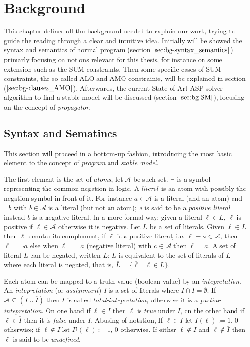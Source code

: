 \chapter{Background}

This chapter defines all the background needed to explain our work,
trying to guide the reading through a clear and intuitive idea.
Initially will be showed the syntax and semantics of normal
program (section $\ref{sec:bg-syntax_semantics}$),
primarly focusing on notions relevant for this thesis, for instance on some
extension such as the SUM constraints.
Then some specific cases of SUM constraints, the so-called ALO and AMO constraints, 
will be explained in section ($\ref{sec:bg-clauses_AMO}$).
Afterwards, the current State-of-Art ASP solver algorithm to find a stable model 
will be discussed (section $\ref{sec:bg-SM}$), focusing on the concept of \textit{propagator}.

\section{Syntax and Sematincs}
\label{sec:bg-syntax_semantics}

This section will proceed in a bottom-up fashion, introducing the 
most basic element to the concept of \textit{program}
and \textit{stable model}.

The first element is the set of \textit{atoms}, let $\mathcal{A}$ be such set.
$\neg$ is a symbol representing the common negation in logic.
A $\emph{literal}$ is an atom with possibly the negation symbol in front of it.
For instance $a \in \mathcal{A}$ is a literal (and an atom) and $\neg b$ with $b \in \mathcal{A}$
is a literal (but not an atom); \textit{a} is said to be a \textit{positive literal} instead
$b$ is a negative literal. In a more formal way: given a literal $\ell \in L$, $\ell$ is 
positive if $\ell \in \mathcal{A}$ otherwise it is negative. Let $L$ be a set of literals.
Given $\ell \in L$ then $\overline{\ell}$ denotes its complement, if $\ell$ is a positive
literal, i.e. $\ell = a \in \mathcal{A}$, then $\overline{\ell} = \neg a$ else 
when $\ell = \neg a$ (negative literal) with $a \in \mathcal{A}$ then $\overline{\ell} = a$.
A set of literal $L$ can be negated, written $\overline{L}$;
$\overline{L}$ is equivalent to the set of literals of $L$ where each literal is negated,
that is, $\overline{L} = \{ \overline{\ell} \mid \ell \in L \}$.

Each atom can be mapped to a truth value (boolean value) by an \textit{intepretation}.
An \textit{intepretation} (or \textit{assignment}) \textit{I} is a set of 
literals where $I \cap \overline{I} = \emptyset$.
If $\mathcal{A} \subseteq (I \cup \overline{I})$ then $I$ is called \textit{total-intepretation},
otherwise it is a \textit{partial-intepretation}.
On one hand if $\ell \in I$ then $\ell$ is \textit{true} under $I$, on the other hand 
if $\ell \in \overline{I}$ then it is \textit{false} under $I$.
Abusing of notation, If $\ell \in I$ let $I(\ell) := 1$, 0 otherwise;
if $\ell \not\in I$ let $I^\uparrow(\ell) := 1$, 0 otherwise.
If either $\ell \not\in I$ and $\ell \not\in \overline{I}$ then $\ell$ is said to be \textit{undefined}. 

